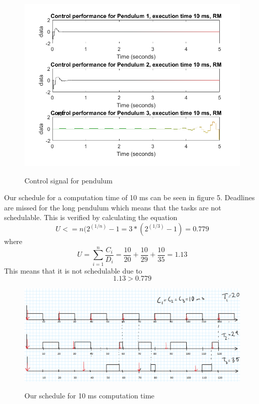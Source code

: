 \documentclass[12pt,a4paper]{article}
\begin{document}
    \begin{center}
      \begin{figure}
        \includegraphics[scale=0.5]{ex532.png}
        \label{fig:ex32}
      \caption{Control signal for pendulum}
      \end{figure}
    \end{center}
    
    
Our schedule for a computation time of 10 ms can be seen in figure 5. Deadlines are missed for the long pendulum which means that the tasks are not schedulable. This is verified by calculating the equation
\begin{equation}
 U <= n(2^{(1/n)}-1 = 3*(2^{(1/3)}-1) = 0.779
\end{equation}
where
\begin{equation}
U = \sum\limits_{i=1}^n \frac{C_i}{D_i} = \frac{10}{20}+\frac{10}{29}+\frac{10}{35} = 1.13
\end{equation}
This means that it is not schedulable due to
\begin{equation}
1.13 > 0.779
\end{equation} 

\begin{center}
	\begin{figure}
	\includegraphics[scale=0.3]{ex541.png}
	\label{fig:ex541}
	\caption{Our schedule for 10 ms computation time}
	\end{figure}
\end{center}
\end{document}
